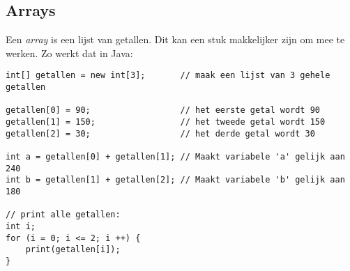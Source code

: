 \documentclass[a4paper,11pt]{report}
\begin{document}
\subsection{Arrays}

Een \emph{array} is een lijst van getallen.  Dit kan een stuk makkelijker zijn om mee te werken.  Zo werkt dat in Java:
\begin{verbatim}
int[] getallen = new int[3];       // maak een lijst van 3 gehele getallen

getallen[0] = 90;                  // het eerste getal wordt 90
getallen[1] = 150;                 // het tweede getal wordt 150
getallen[2] = 30;                  // het derde getal wordt 30

int a = getallen[0] + getallen[1]; // Maakt variabele 'a' gelijk aan 240
int b = getallen[1] + getallen[2]; // Maakt variabele 'b' gelijk aan 180

// print alle getallen:
int i;
for (i = 0; i <= 2; i ++) {
    print(getallen[i]);
}
\end{verbatim}
\end{document}
